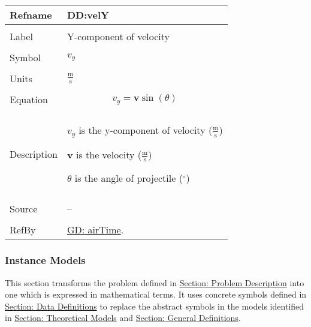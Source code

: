 \documentclass[12pt]{article}
\begin{document}
\noindent \begin{minipage}{\textwidth}
\begin{tabular}{p{} p{}}
\toprule \textbf{Refname} & \textbf{DD:velY}
\label{DD:velY}
\\ \midrule \\
Label & Y-component of velocity
\\ \midrule \\
Symbol & ${v_{y}}$
\\ \midrule \\
Units & $\frac{\text{m}}{\text{s}}$
\\ \midrule \\
Equation & \begin{displaymath}
           {v_{y}}=\mathbf{v} \sin\left(θ\right)
           \end{displaymath}
\\ \midrule \\
Description & \begin{symbDescription}
              \item{${v_{y}}$ is the y-component of velocity ($\frac{\text{m}}{\text{s}}$)}
              \item{$\mathbf{v}$ is the velocity ($\frac{\text{m}}{\text{s}}$)}
              \item{$θ$ is the angle of projectile (${}^{\circ}$)}
              \end{symbDescription}
\\ \midrule \\
Source & --
\\ \midrule \\
RefBy & \hyperref[GD:airTime]{GD: airTime}.
\\ \bottomrule \end{tabular}
\end{minipage}
\subsubsection{Instance Models}
\label{Sec:IMs}
This section transforms the problem defined in \hyperref[Sec:ProbDesc]{Section: Problem Description} into one which is expressed in mathematical terms. It uses concrete symbols defined in \hyperref[Sec:DDs]{Section: Data Definitions} to replace the abstract symbols in the models identified in \hyperref[Sec:TMs]{Section: Theoretical Models} and \hyperref[Sec:GDs]{Section: General Definitions}.
\par~
\end{document}
